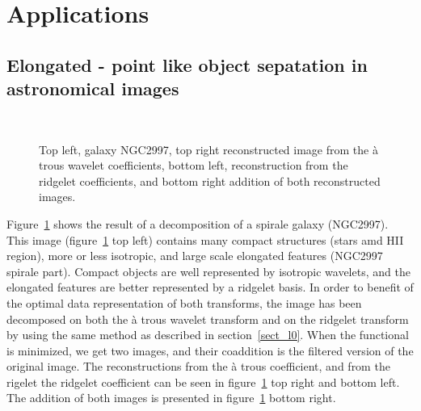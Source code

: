 \documentclass[11pt,draft]{IEEEtran} %
\begin{document}
\section{Applications}
\subsection{Elongated - point like object sepatation in astronomical images}

\begin{figure}[htb]
\centerline{
\vbox{
\hbox{
}
\hbox{
}}}
\caption{Top left, galaxy NGC2997, top right reconstructed image from
the \`a trous wavelet coefficients, bottom left, reconstruction from
the ridgelet coefficients, and bottom right addition of both reconstructed
images.}
\label{fig_cb2_ngc}
\end{figure}
Figure~\ref{fig_cb2_ngc} shows the result of a decomposition 
of a spirale galaxy (NGC2997).
This image (figure~\ref{fig_cb2_ngc} top left) contains
many compact structures (stars amd HII region), more
or less isotropic, and large scale elongated features (NGC2997 spirale part).
Compact objects are well represented by isotropic wavelets, and the  
elongated features are better represented by a ridgelet basis. 
In order to benefit of the optimal data representation of both transforms,
 the image has been decomposed on both the \`a trous wavelet transform and on 
the ridgelet transform by using the same method as described in
section~\ref{sect_l0}. When the functional is minimized, we get two 
images, and their coaddition is the filtered version of the original image.
The reconstructions from the \`a trous coefficient, and from the rigelet
the ridgelet coefficient can be seen in figure~\ref{fig_cb2_ngc} top right
and bottom left. The addition of both images is presented 
in figure~\ref{fig_cb2_ngc} bottom right.
\end{document}

